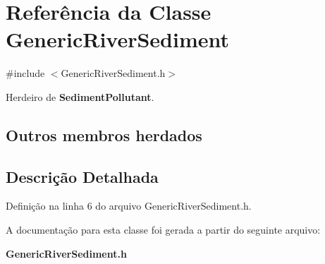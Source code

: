 \section{Referência da Classe Generic\+River\+Sediment}
\label{class_generic_river_sediment}


{\ttfamily \#include $<$Generic\+River\+Sediment.\+h$>$}



Herdeiro de {\bf Sediment\+Pollutant}.

\subsection*{Outros membros herdados}


\subsection{Descrição Detalhada}


Definição na linha 6 do arquivo Generic\+River\+Sediment.\+h.



A documentação para esta classe foi gerada a partir do seguinte arquivo\+:\begin{DoxyCompactItemize}
\item 
{\bf Generic\+River\+Sediment.\+h}\end{DoxyCompactItemize}
